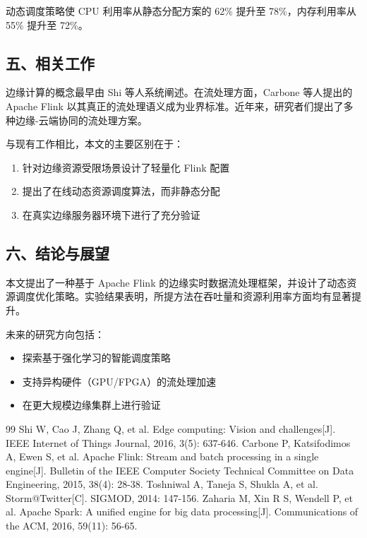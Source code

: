 \documentclass{harryopo-paper}
\begin{document}
动态调度策略使 CPU 利用率从静态分配方案的 62\% 提升至 78\%，内存利用率从 55\% 提升至 72\%。

\subsection*{五、相关工作}

边缘计算的概念最早由 Shi 等人系统阐述。在流处理方面，Carbone 等人提出的 Apache Flink 以其真正的流处理语义成为业界标准。近年来，研究者们提出了多种边缘-云端协同的流处理方案。

与现有工作相比，本文的主要区别在于：

\begin{enumerate}
  \item 针对边缘资源受限场景设计了轻量化 Flink 配置
  \item 提出了在线动态资源调度算法，而非静态分配
  \item 在真实边缘服务器环境下进行了充分验证
\end{enumerate}

\subsection*{六、结论与展望}

本文提出了一种基于 Apache Flink 的边缘实时数据流处理框架，并设计了动态资源调度优化策略。实验结果表明，所提方法在吞吐量和资源利用率方面均有显著提升。

未来的研究方向包括：

\begin{itemize}
  \item 探索基于强化学习的智能调度策略
  \item 支持异构硬件（GPU/FPGA）的流处理加速
  \item 在更大规模边缘集群上进行验证
\end{itemize}

\begin{thebibliography}{99}
 Shi W, Cao J, Zhang Q, et al. Edge computing: Vision and challenges[J]. IEEE Internet of Things Journal, 2016, 3(5): 637-646.
 Carbone P, Katsifodimos A, Ewen S, et al. Apache Flink: Stream and batch processing in a single engine[J]. Bulletin of the IEEE Computer Society Technical Committee on Data Engineering, 2015, 38(4): 28-38.
 Toshniwal A, Taneja S, Shukla A, et al. Storm@Twitter[C]. SIGMOD, 2014: 147-156.
 Zaharia M, Xin R S, Wendell P, et al. Apache Spark: A unified engine for big data processing[J]. Communications of the ACM, 2016, 59(11): 56-65.
\end{thebibliography}
\end{document}

